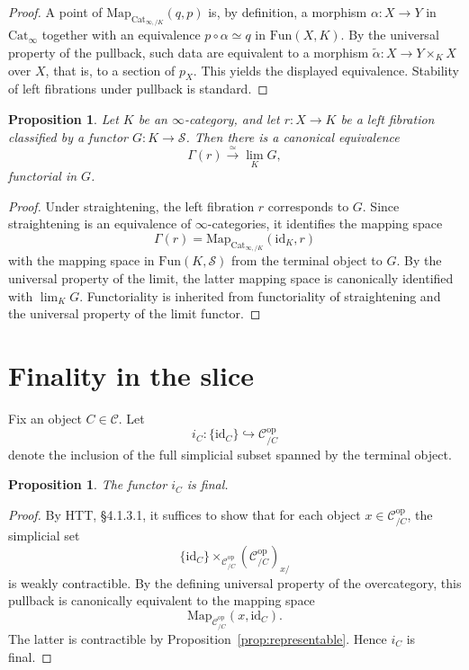 \documentclass[11pt]{article}
\newtheorem{proposition}[theorem]{Proposition}
\theoremstyle{definition}
\newcommand{\C}{\mathcal{C}}
\newcommand{\Sps}{\mathcal{S}}
\newcommand{\Fun}{\mathrm{Fun}}
\newcommand{\Map}{\mathrm{Map}}
\newcommand{\id}{\mathrm{id}}
\newcommand{\op}{\mathrm{op}}
\begin{document}
\begin{proof}
A point of $\Map_{\mathrm{Cat}_{\infty,/K}}(q,p)$ is, by definition, a morphism
$\alpha \colon X \to Y$ in $\mathrm{Cat}_{\infty}$ together with an equivalence
$p \circ \alpha \simeq q$ in $\Fun(X,K)$. By the universal property of the
pullback, such data are equivalent to a morphism
$\widetilde{\alpha} \colon X \to Y \times_K X$ over $X$, that is, to a section of
$p_X$. This yields the displayed equivalence. Stability of left fibrations under
pullback is standard.
\end{proof}

\begin{proposition}\label{prop:sections-limits}
Let $K$ be an $\infty$-category, and let $r \colon X \to K$ be a left fibration
classified by a functor $G \colon K \to \Sps$. Then there is a canonical
equivalence
\[
  \Gamma(r) \xrightarrow{\simeq} \lim_K G,
\]
functorial in $G$.
\end{proposition}

\begin{proof}
Under straightening, the left fibration $r$ corresponds to $G$. Since
straightening is an equivalence of $\infty$-categories, it identifies the mapping
space
\[
  \Gamma(r)=\Map_{\mathrm{Cat}_{\infty,/K}}(\id_K,r)
\]
with the mapping space in $\Fun(K,\Sps)$ from the terminal object to $G$. By the
universal property of the limit, the latter mapping space is canonically
identified with $\lim_K G$. Functoriality is inherited from functoriality of
straightening and the universal property of the limit functor.
\end{proof}

\section{Finality in the slice}

Fix an object $C \in \C$. Let
\[
  i_C \colon \{\id_C\} \hookrightarrow \C^{\op}_{/C}
\]
denote the inclusion of the full simplicial subset spanned by the terminal object.

\begin{proposition}\label{prop:final}
The functor $i_C$ is final.
\end{proposition}

\begin{proof}
By HTT, \S4.1.3.1, it suffices to show that for each object
$x \in \C^{\op}_{/C}$, the simplicial set
\[
  \{\id_C\} \times_{\C^{\op}_{/C}} (\C^{\op}_{/C})_{x/}
\]
is weakly contractible. By the defining universal property of the overcategory,
this pullback is canonically equivalent to the mapping space
\[
  \Map_{\C^{\op}_{/C}}(x,\id_C).
\]
The latter is contractible by Proposition~\ref{prop:representable}. Hence $i_C$
is final.
\end{proof}
\end{document}
